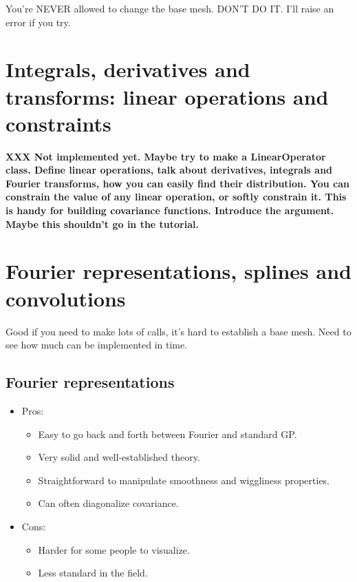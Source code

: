 \documentclass{manual}
\begin{document}
You're NEVER allowed to change the base mesh. DON'T DO IT. I'll raise an error if you try.

\section{Integrals, derivatives and transforms: linear operations and constraints}\label{sec:linop} %

\textbf{XXX Not implemented yet. Maybe try to make a LinearOperator class. Define linear operations, talk about derivatives, integrals and Fourier transforms, how you can easily find their distribution. You can constrain the value of any linear operation, or softly constrain it. This is handy for building covariance functions. Introduce the  argument. Maybe this shouldn't go in the tutorial.}


\section{Fourier representations, splines and convolutions}\label{sec:approx} %
Good if you need to make lots of calls, it's hard to establish a base mesh. Need to see how much can be implemented in time.

\subsection{Fourier representations}\label{sub:fourier}
\begin{itemize}
	\item Pros:
	\begin{itemize}
		\item Easy to go back and forth between Fourier and standard GP.
		\item Very solid and well-established theory.
		\item Straightforward to manipulate smoothness and wiggliness properties.
		\item Can often diagonalize covariance.
	\end{itemize}
	\item Cons:
	\begin{itemize}
		\item Harder for some people to visualize.
		\item Less standard in the field.
	\end{itemize}
\end{itemize}
\end{document}
